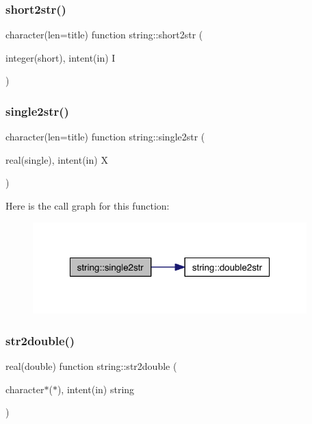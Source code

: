 \subsubsection{\texorpdfstring{short2str()}{short2str()}}
{\footnotesize\ttfamily character(len=title) function string\+::short2str (\begin{DoxyParamCaption}\item[{integer(short), intent(in)}]{I }\end{DoxyParamCaption})\hspace{0.3cm}{\ttfamily [private]}}

\mbox{\label{namespacestring_a78ede8e0d165537ea978aeeb8227bc3f}} 
\subsubsection{\texorpdfstring{single2str()}{single2str()}}
{\footnotesize\ttfamily character(len=title) function string\+::single2str (\begin{DoxyParamCaption}\item[{real(single), intent(in)}]{X }\end{DoxyParamCaption})\hspace{0.3cm}{\ttfamily [private]}}

Here is the call graph for this function\+:\nopagebreak
\begin{figure}[H]
\begin{center}
\leavevmode
\includegraphics[width=300pt]{namespacestring_a78ede8e0d165537ea978aeeb8227bc3f_cgraph}
\end{center}
\end{figure}
\mbox{\label{namespacestring_a73d6072e501eb7ed3d5aa9e4a5a47f6d}} 
\subsubsection{\texorpdfstring{str2double()}{str2double()}}
{\footnotesize\ttfamily real(double) function string\+::str2double (\begin{DoxyParamCaption}\item[{character$\ast$($\ast$), intent(in)}]{string }\end{DoxyParamCaption})\hspace{0.3cm}{\ttfamily [private]}}


